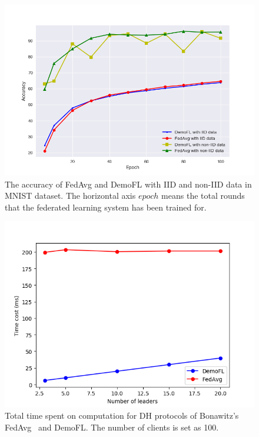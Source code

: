 \begin{figure}[!ht]
    \centering
    \includegraphics[width=\columnwidth]{img/acc.png}
    \caption{The accuracy of FedAvg and DemoFL with IID and non-IID data in MNIST dataset. The horizontal axis $epoch$ means the total rounds that the federated learning system has been trained for.}
    \label{acc}
\end{figure}

\begin{figure}[!ht]
    \centering
    \includegraphics[width=\columnwidth]{img/leader-time.png}
    \caption{Total time spent on computation for DH protocols of Bonawitz's FedAvg~\cite{Practical} and DemoFL. The number of clients is set as 100.}
    \label{leader-time}
\end{figure}

